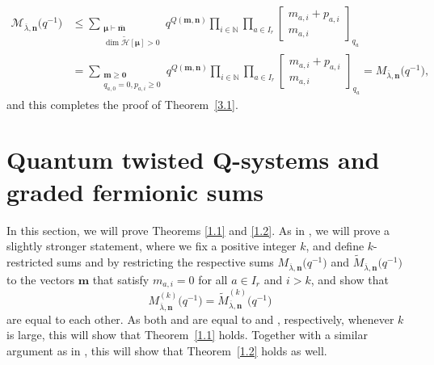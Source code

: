 \documentclass[pdftex]{sigma}
\numberwithin{equation}{section}
\begin{document}
\begin{align*}
\mathcal{M}_{\overline{\lambda},\mathbf{n}}\bigl(q^{-1}\bigr)
&\leq \sum_{\substack{\bm{\mu}\vdash \overline{\mathbf{m}}\\ \dim\tilde{\mathcal{H}}[\bm{\mu}]>0}} q^{Q( \mathbf{m},\mathbf{n})}\prod_{i\in\mathbb{N}}\prod_{a\in I_r} \begin{bmatrix} m_{a,i}+p_{a,i}\\m_{a,i}\end{bmatrix}_{q_a}\\
&=\sum_{\substack{\mathbf{m}\geq\mathbf{0}\\q_{a,0}=0,p_{a,i}\geq0}}q^{Q(\mathbf{m},\mathbf{n})}\prod_{i\in \mathbb{N}}\prod_{a\in I_r}\begin{bmatrix}m_{a,i}+p_{a,i}\\ m_{a,i}\end{bmatrix}_{q_a}=M_{\overline{\lambda},\mathbf{n}}\bigl(q^{-1}\bigr),
\end{align*}
and this completes the proof of Theorem~\ref{3.1}.

\section[Quantum twisted Q-systems and graded fermionic sums]{Quantum twisted $\boldsymbol{Q}$-systems and graded fermionic sums}\label{Section 4}

In this section, we will prove Theorems \ref{1.1} and \ref{1.2}. As in \cite{DFK08, DFK14, Lin21}, we will prove a slightly stronger statement, where we fix a positive integer $k$, and define $k$-restricted sums  and  by restricting the respective sums $M_{\overline{\lambda}, \mathbf{n}}\bigl(q^{-1}\bigr)$ and $\tilde{M}_{\overline{\lambda}, \mathbf{n}}\bigl(q^{-1}\bigr)$ to the vectors $\mathbf{m}$ that satisfy $m_{a,i}=0$ for all $a\in I_r$ and $i>k$, and show that
\[
M_{\overline{\lambda}, \mathbf{n}}^{(k)}\bigl(q^{-1}\bigr)=\tilde{M}_{\overline{\lambda}, \mathbf{n}}^{(k)}\bigl(q^{-1}\bigr)
\]
 are equal to each other. As both  and  are equal to  and , respectively, whenever $k$ is large, this will show that Theorem~\ref{1.1} holds. Together with a similar argument as in \cite[Section~1]{Kedem11}, this will show that Theorem~\ref{1.2} holds as well.
\end{document}
